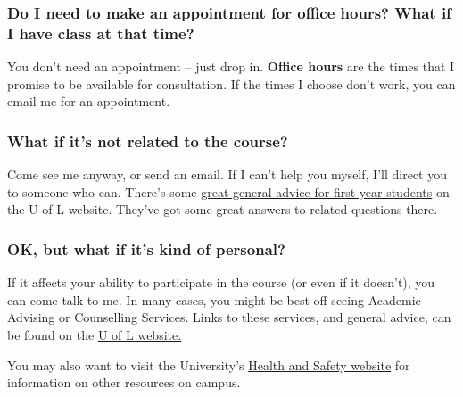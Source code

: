 \documentclass[10pt,]{article}
\newcommand{\terminology}[1]{\textbf{#1}}
\begin{document}
\subsubsection[{Do I need to make an appointment for office hours? What if I have class at that time?}]{Do I need to make an appointment for office hours? What if I have class at that time?}\label{subsubsection-4}
\hypertarget{p-9}{}%
You don't need an appointment -- just drop in. \terminology{Office hours} are the times that I promise to be available for consultation. If the times I choose don't work, you can email me for an appointment.%
%
%
\typeout{************************************************}
\typeout{************************************************}
%
\subsubsection[{What if it's not related to the course?}]{What if it's not related to the course?}\label{subsubsection-5}
\hypertarget{p-10}{}%
Come see me anyway, or send an email. If I can't help you myself, I'll direct you to someone who can. There's some \href{https://www.uleth.ca/services-for-students/what-do-i-do-if}{great general advice for first year students} on the U of L website. They've got some great answers to related questions there.%
%
%
\typeout{************************************************}
\typeout{************************************************}
%
\subsubsection[{OK, but what if it's kind of personal?}]{OK, but what if it's kind of personal?}\label{question-help}
\hypertarget{p-11}{}%
If it affects your ability to participate in the course (or even if it doesn't), you can come talk to me. In many cases, you might be best off seeing Academic Advising or Counselling Services. Links to these services, and general advice, can be found on the \href{https://www.uleth.ca/services-for-students/what-do-i-do-if/personal-non-academic}{U of L website.}%
\par
\hypertarget{p-12}{}%
You may also want to visit the University's \href{https://www.uleth.ca/services-for-students/health-safety}{Health and Safety website} for information on other resources on campus.%
%
%
\typeout{************************************************}
\typeout{************************************************}
%
\end{document}
